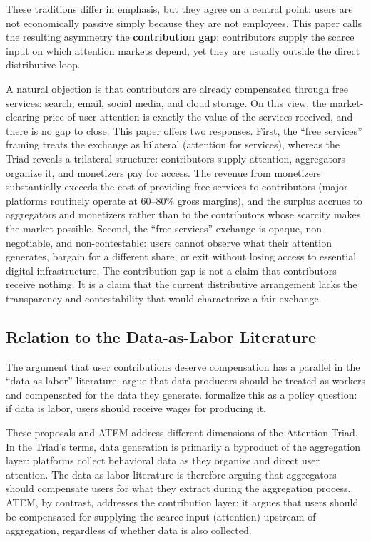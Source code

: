 \documentclass[12pt, a4paper]{article}
\begin{document}
These traditions differ in emphasis, but they agree on a central point: users are not economically passive simply because they are not employees. This paper calls the resulting asymmetry the \textbf{contribution gap}: contributors supply the scarce input on which attention markets depend, yet they are usually outside the direct distributive loop.

A natural objection is that contributors are already compensated through free services: search, email, social media, and cloud storage. On this view, the market-clearing price of user attention is exactly the value of the services received, and there is no gap to close. This paper offers two responses. First, the ``free services'' framing treats the exchange as bilateral (attention for services), whereas the Triad reveals a trilateral structure: contributors supply attention, aggregators organize it, and monetizers pay for access. The revenue from monetizers substantially exceeds the cost of providing free services to contributors (major platforms routinely operate at 60--80\% gross margins), and the surplus accrues to aggregators and monetizers rather than to the contributors whose scarcity makes the market possible. Second, the ``free services'' exchange is opaque, non-negotiable, and non-contestable: users cannot observe what their attention generates, bargain for a different share, or exit without losing access to essential digital infrastructure. The contribution gap is not a claim that contributors receive nothing. It is a claim that the current distributive arrangement lacks the transparency and contestability that would characterize a fair exchange.

\subsection{Relation to the Data-as-Labor Literature}
\label{sec:triad-dal}

The argument that user contributions deserve compensation has a parallel in the ``data as labor'' literature. \citet{posner2018} argue that data producers should be treated as workers and compensated for the data they generate. \citet{arrieta2018} formalize this as a policy question: if data is labor, users should receive wages for producing it.

These proposals and ATEM address different dimensions of the Attention Triad. In the Triad's terms, data generation is primarily a byproduct of the aggregation layer: platforms collect behavioral data as they organize and direct user attention. The data-as-labor literature is therefore arguing that aggregators should compensate users for what they extract during the aggregation process. ATEM, by contrast, addresses the contribution layer: it argues that users should be compensated for supplying the scarce input (attention) upstream of aggregation, regardless of whether data is also collected.
\end{document}
